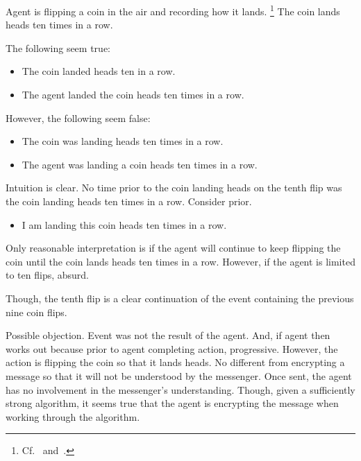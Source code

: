\begin{note}
  \begin{illustration}
    \label{illu:fc:coins}
    Agent is flipping a coin in the air and recording how it lands.%
    \footnote{
      Cf.~\textcite{Gelman:2002ww} and~\textcite{Keller:1986tz}.
    }
    The coin lands heads ten times in a row.

    The following seem true:
    \begin{itemize}
    \item
      The coin landed heads ten in a row.
    \item
      The agent landed the coin heads ten times in a row.
    \end{itemize}
    However, the following seem false:
    \begin{itemize}
    \item
      The coin was landing heads ten times in a row.
    \item
      The agent was landing a coin heads ten times in a row.
    \end{itemize}
    \vspace{-\baselineskip}
  \end{illustration}
  Intuition is clear.
  No time prior to the coin landing heads on the tenth flip was the coin landing heads ten times in a row.
  Consider prior.
  \begin{itemize}
  \item
    I am landing this coin heads ten times in a row.
  \end{itemize}
  Only reasonable interpretation is if the agent will continue to keep flipping the coin until the coin lands heads ten times in a row.
  However, if the agent is limited to ten flips, absurd.

  Though, the tenth flip is a clear continuation of the event containing the previous nine coin flips.

  Possible objection.
  Event was not the result of the agent.
  And, if agent then works out because prior to agent completing action, progressive.
  However, the action is flipping the coin so that it lands heads.
  No different from encrypting a message so that it will not be understood by the messenger.
  Once sent, the agent has no involvement in the messenger's understanding.
  Though, given a sufficiently strong algorithm, it seems true that the agent is encrypting the message when working through the algorithm.
\end{note}

